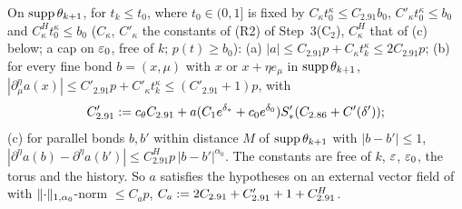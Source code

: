 \begin{lemma}\label{lem:a06g:A}
On $\operatorname{supp}\theta_{k+1}$, for $t_k\le t_0$, where $t_0\in(0,1]$ is fixed by $C_\kappa t_0^\kappa\le C_{2.91}b_0$, $C'_\kappa t_0^\kappa\le b_0$ and $C^H_\kappa t_0^\kappa\le b_0$ ($C_\kappa$, $C'_\kappa$ the constants of (R2) of Step~3(C$_2$), $C^H_\kappa$ that of (c) below; a cap on $\varepsilon_0$, free of $k$; $p(t)\ge b_0$): \textup{(a)} $|a|\le C_{2.91}p+C_\kappa t_k^\kappa\le2C_{2.91}p$; \textup{(b)} for every fine bond $b=(x,\mu)$ with $x$ or $x+\eta e_\mu$ in $\operatorname{supp}\theta_{k+1}$, $|\partial^\eta_\mu a(x)|\le C'_{2.91}p+C'_\kappa t_k^\kappa\le(C'_{2.91}+1)p$, with
\[
C'_{2.91}:= c_\theta C_{2.91}+a(C_1e^{\delta_*}+c_0e^{\delta_0})S'_*(C_{2.86}+C'(\delta'));
\]
\textup{(c)} for parallel bonds $b,b'$ within distance $M$ of $\operatorname{supp}\theta_{k+1}$ with $|b-b'|\le1$, $|\partial^\eta a(b)-\partial^\eta a(b')|\le C^H_{2.91}p\,|b-b'|^{\alpha_0}$. The constants are free of $k$, $\varepsilon$, $\varepsilon_0$, the torus and the history. So $a$ satisfies the hypotheses on an external vector field of \cite[p.~412]{Ba3} with $\lVert \cdot\rVert_{1,\alpha_0}$-norm $\le C_ap$, $C_a:=2C_{2.91}+C'_{2.91}+1+C^H_{2.91}$.
\end{lemma}

